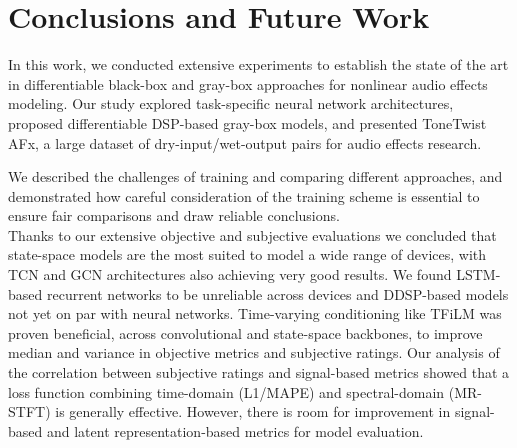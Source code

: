 


\section{Conclusions and Future Work}
\label{sec:conclusion}
In this work, we conducted extensive experiments to establish the state of the art in differentiable black-box and gray-box approaches for nonlinear audio effects modeling.
Our study explored task-specific neural network architectures, proposed differentiable DSP-based gray-box models, and presented ToneTwist AFx, a large dataset of dry-input/wet-output pairs for audio effects research.

We described the challenges of training and comparing different approaches, and demonstrated how careful consideration of the training scheme is essential to ensure fair comparisons and draw reliable conclusions.\\
Thanks to our extensive objective and subjective evaluations we concluded that state-space models are the most suited to model a wide range of devices, with TCN and GCN architectures also achieving very good results.
We found LSTM-based recurrent networks to be unreliable across devices and DDSP-based models not yet on par with neural networks.
Time-varying conditioning like TFiLM was proven beneficial, across convolutional and state-space backbones, to improve median and variance in objective metrics and subjective ratings.
Our analysis of the correlation between subjective ratings and signal-based metrics showed that a loss function combining time-domain (L1/MAPE) and spectral-domain (MR-STFT) is generally effective. 
However, there is room for improvement in signal-based and latent representation-based metrics for model evaluation.

